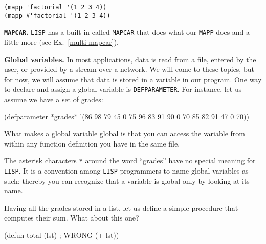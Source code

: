 \documentclass[a4paper,11pt]{article}
\begin{document}
\begin{uenum}
\begin{uenumi}
\begin{ucodeframe}
\begin{Verbatim}
(mapp 'factorial '(1 2 3 4))
(mapp #'factorial '(1 2 3 4))
\end{Verbatim}
\end{ucodeframe}

\end{uenumi}


\item {\bf \Verb+MAPCAR+.} \Verb+LISP+ has a built-in called \Verb+MAPCAR+ that does what our \Verb+MAPP+ does and a little more (see Ex.\ \ref{multi-mapcar}).
\item {\bf Global variables.} In most applications, data is read from a file, entered by the user, or provided by a stream over a network. We will come to these topics, but for now, we will assume that data is stored in a  variable in our program. One way to declare and assign a global variable is \Verb+DEFPARAMETER+. For instance, let us assume we have a set of grades:

\begin{lispcode}
(defparameter *grades* 
	'(86 98 79 45 0 75 96 83 91 90 0 70 85 82 91 47 0 70))
\end{lispcode}

\begin{uenumii}
\item What makes a global variable global is that you can access the variable from within any function definition you have in the same file. 
\item The asterisk characters \Verb+*+ around the word ``grades'' have no special meaning for \Verb+LISP+. It is a convention among \Verb+LISP+ programmers to name global variables as such; thereby you can recognize that a variable is global only by looking at its name.
\end{uenumii}

\item Having all the grades stored in a list, let us define a simple procedure that computes their sum. What about this one?  

\begin{lispcode}
(defun total (lst) ; WRONG
  (+ lst))
\end{lispcode}


\end{uenum}
\end{document}
